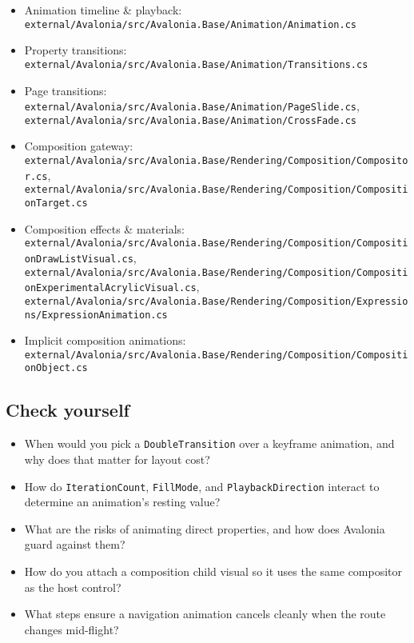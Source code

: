 \begin{itemize}
\tightlist
\item
  Animation timeline \& playback:
  \passthrough{\lstinline!external/Avalonia/src/Avalonia.Base/Animation/Animation.cs!}
\item
  Property transitions:
  \passthrough{\lstinline!external/Avalonia/src/Avalonia.Base/Animation/Transitions.cs!}
\item
  Page transitions:
  \passthrough{\lstinline!external/Avalonia/src/Avalonia.Base/Animation/PageSlide.cs!},
  \passthrough{\lstinline!external/Avalonia/src/Avalonia.Base/Animation/CrossFade.cs!}
\item
  Composition gateway:
  \passthrough{\lstinline!external/Avalonia/src/Avalonia.Base/Rendering/Composition/Compositor.cs!},
  \passthrough{\lstinline!external/Avalonia/src/Avalonia.Base/Rendering/Composition/CompositionTarget.cs!}
\item
  Composition effects \& materials:
  \passthrough{\lstinline!external/Avalonia/src/Avalonia.Base/Rendering/Composition/CompositionDrawListVisual.cs!},
  \passthrough{\lstinline!external/Avalonia/src/Avalonia.Base/Rendering/Composition/CompositionExperimentalAcrylicVisual.cs!},
  \passthrough{\lstinline!external/Avalonia/src/Avalonia.Base/Rendering/Composition/Expressions/ExpressionAnimation.cs!}
\item
  Implicit composition animations:
  \passthrough{\lstinline!external/Avalonia/src/Avalonia.Base/Rendering/Composition/CompositionObject.cs!}
\end{itemize}

\subsection{Check yourself}\label{check-yourself-27}

\begin{itemize}
\tightlist
\item
  When would you pick a \passthrough{\lstinline!DoubleTransition!} over
  a keyframe animation, and why does that matter for layout cost?
\item
  How do \passthrough{\lstinline!IterationCount!},
  \passthrough{\lstinline!FillMode!}, and
  \passthrough{\lstinline!PlaybackDirection!} interact to determine an
  animation's resting value?
\item
  What are the risks of animating direct properties, and how does
  Avalonia guard against them?
\item
  How do you attach a composition child visual so it uses the same
  compositor as the host control?
\item
  What steps ensure a navigation animation cancels cleanly when the
  route changes mid-flight?
\end{itemize}

